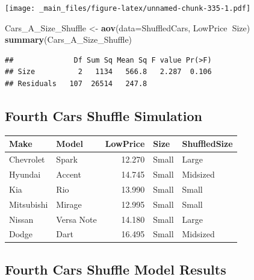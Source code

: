 \documentclass[]{book}
\newenvironment{Shaded}{\begin{snugshade}}{\end{snugshade}}
\newcommand{\KeywordTok}[1]{\textcolor[rgb]{0.13,0.29,0.53}{\textbf{#1}}}
\newcommand{\DataTypeTok}[1]{\textcolor[rgb]{0.13,0.29,0.53}{#1}}
\newcommand{\DecValTok}[1]{\textcolor[rgb]{0.00,0.00,0.81}{#1}}
\newcommand{\StringTok}[1]{\textcolor[rgb]{0.31,0.60,0.02}{#1}}
\newcommand{\OperatorTok}[1]{\textcolor[rgb]{0.81,0.36,0.00}{\textbf{#1}}}
\newcommand{\NormalTok}[1]{#1}
\begin{document}
\texttt{[image: \_main\_files/figure-latex/unnamed-chunk-335-1.pdf]}

\begin{Shaded}
\begin{Highlighting}[]
\NormalTok{Cars_A_Size_Shuffle <-}\StringTok{ }\KeywordTok{aov}\NormalTok{(}\DataTypeTok{data=}\NormalTok{ShuffledCars, LowPrice}\OperatorTok{~}\NormalTok{Size)}
\KeywordTok{summary}\NormalTok{(Cars_A_Size_Shuffle)}
\end{Highlighting}
\end{Shaded}

\begin{verbatim}
##              Df Sum Sq Mean Sq F value Pr(>F)
## Size          2   1134   566.8   2.287  0.106
## Residuals   107  26514   247.8
\end{verbatim}

\subsection{Fourth Cars Shuffle
Simulation}\label{fourth-cars-shuffle-simulation-1}

\begin{Shaded}
\end{Shaded}

\begin{tabular}{l|l|r|l|l}
\hline
Make & Model & LowPrice & Size & ShuffledSize\\
\hline
Chevrolet & Spark & 12.270 & Small & Large\\
\hline
Hyundai & Accent & 14.745 & Small & Midsized\\
\hline
Kia & Rio & 13.990 & Small & Small\\
\hline
Mitsubishi & Mirage & 12.995 & Small & Small\\
\hline
Nissan & Versa Note & 14.180 & Small & Large\\
\hline
Dodge & Dart & 16.495 & Small & Midsized\\
\hline
\end{tabular}

\subsection{Fourth Cars Shuffle Model
Results}\label{fourth-cars-shuffle-model-results-1}
\end{document}
